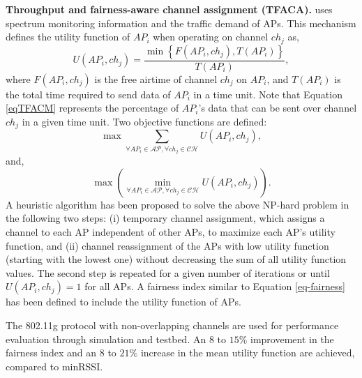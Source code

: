 \label{TFACM}
\textbf{Throughput and fairness-aware channel assignment (TFACA).}
\cite{CA-VTC-14} uses spectrum monitoring information and the traffic demand of APs.
This mechanism defines the utility function of $AP_i$ when operating on channel $ch_{j}$ as,
%
\begin{equation}
\label{eqTFACM}
U(AP_{i}, ch_{j})=\frac{\min\left\{F(AP_{i},ch_{j}), T(AP_{i}) \right\}}{T(AP_{i})} ,
\end{equation}
where $F(AP_{i},ch_{j})$ is the free airtime of channel $ch_{j}$ on $AP_{i}$, and $T(AP_{i})$ is the total time required to send data of $AP_i$ in a time unit. 
Note that Equation \ref {eqTFACM} represents the percentage of $AP_i$'s data that can be sent over channel $ch_{j}$ in a given time unit.
Two objective functions are defined:
\begin{equation}
 \max\sum_{\forall AP_{i}\in\mathcal{AP}, \forall ch_{j} \in \mathcal{CH}}{U(AP_{i}, ch_{j})},
\end{equation}
%
and,
\begin{equation}
\max(\min_{\forall AP_{i}\in\mathcal{AP}, \forall ch_{j} \in \mathcal{CH}}{U(AP_{i}, ch_{j})}).
\end{equation}
A heuristic algorithm has been proposed to solve the above NP-hard problem in the following two steps:
(i) temporary channel assignment, which assigns a channel to each AP independent of other APs, to maximize each AP's utility function, and (ii) channel reassignment of the APs with low utility function (starting with the lowest one) without decreasing the sum of all utility function values. 
The second step is repeated for a given number of iterations or until $U(AP_{i}, ch_{j})=1$ for all APs. 
A fairness index similar to Equation \ref{eq-fairness} has been defined to include the utility function of APs. 

The 802.11g protocol with non-overlapping channels are used for performance evaluation through simulation and testbed. 
An $8$ to $15\%$ improvement in the fairness index and an $8$ to $21\%$ increase in the mean utility function are achieved, compared to minRSSI. 



